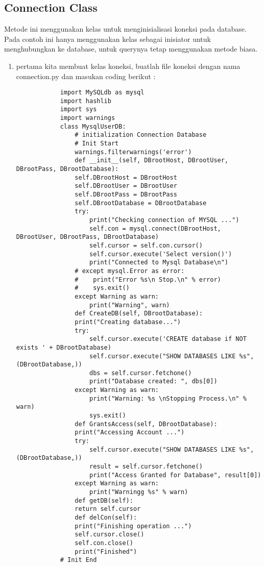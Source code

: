 \subsection {Connection Class}
	Metode ini menggunakan kelas untuk menginisialisasi koneksi pada database. Pada contoh ini hanya menggunakan kelas sebagai inisiator untuk menghubungkan ke database, untuk querynya tetap menggunakan metode biasa.
	\begin{enumerate}
		\item pertama kita membuat kelas koneksi, buatlah file koneksi dengan nama connection.py dan masukan coding berikut :
			\begin{verbatim}
			import MySQLdb as mysql
			import hashlib
			import sys
			import warnings
			class MysqlUserDB:
    			# initialization Connection Database
    			# Init Start
    			warnings.filterwarnings('error')
    			def __init__(self, DBrootHost, DBrootUser, DBrootPass, DBrootDatabase):
        		self.DBrootHost = DBrootHost
        		self.DBrootUser = DBrootUser
        		self.DBrootPass = DBrootPass
        		self.DBrootDatabase = DBrootDatabase
        		try:
            		print("Checking connection of MYSQL ...")
            		self.con = mysql.connect(DBrootHost, DBrootUser, DBrootPass, DBrootDatabase)
            		self.cursor = self.con.cursor()
            		self.cursor.execute('Select version()')
            		print("Connected to Mysql Database\n")
        		# except mysql.Error as error:
        		#    print("Error %s\n Stop.\n" % error)
        		#    sys.exit()
        		except Warning as warn:
            		print("Warning", warn)
    			def CreateDB(self, DBrootDatabase):
        		print("Creating database...")
        		try:
            		self.cursor.execute('CREATE database if NOT exists ' + DBrootDatabase)
            		self.cursor.execute("SHOW DATABASES LIKE %s", (DBrootDatabase,))
            		dbs = self.cursor.fetchone()
            		print("Database created: ", dbs[0])
        		except Warning as warn:
            		print("Warning: %s \nStopping Process.\n" % warn)
            		sys.exit()
    			def GrantsAccess(self, DBrootDatabase):
        		print("Accessing Account ...")
        		try:
            		self.cursor.execute("SHOW DATABASES LIKE %s", (DBrootDatabase,))
            		result = self.cursor.fetchone()
            		print("Access Granted for Database", result[0])
        		except Warning as warn:
            		print("Warningg %s" % warn)
    			def getDB(self):
        		return self.cursor
    			def delCon(self):
        		print("Finishing operation ...")
        		self.cursor.close()
        		self.con.close()
        		print("Finished")
			# Init End
		\end{verbatim}


\end{enumerate}
